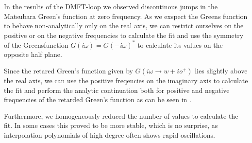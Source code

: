 \begin{appendix}
In the results of the DMFT-loop we observed discontinous jumps in the Matsubara Green's function at zero frequency.
As we exspect the Greens function to behave non-analytically only on the real axis, we can restrict ourselves on the positive or on the negative frequencies to calculate the fit and use the symmetry of the Greensfunction $G(iω)=G(-iω)^*$ to calculate its values on the opposite half plane.

Since the retared Green's function given by $G(i ω \to w + i o^+)$ lies slightly above the real axis, we can use the positive freqencies on the imaginary axis to calculate the fit and perform the analytic continuation both for positive and negative frequencies of the retarded Green's function as can be seen in .

Furthermore, we homogeneously reduced the number of values to calculate the fit. In some cases this proved to be more stable, which is no surprise, as interpolation polynomials of high degree often shows rapid oscillations.


\end{appendix}
